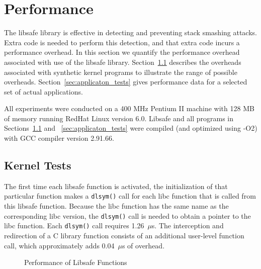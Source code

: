 \documentclass[]{article}
\begin{document}
\section{Performance}
\label{sec:performance}

The libsafe library is effective in detecting and preventing stack smashing
attacks.  Extra code is needed to perform this detection, and that extra code
incurs a performance overhead.  In this section we quantify the performance
overhead associated with use of the libsafe library.
Section~\ref{sec:kernel_tests} describes the overheads associated with
synthetic kernel programs to illustrate the range of possible overheads.
Section~\ref{sec:applicaton_tests} gives performance data for a selected set of
actual applications.

All experiments were conducted on a 400 MHz Pentium II machine with 128 MB of
memory running RedHat Linux version 6.0.  Libsafe and all programs in
Sections~\ref{sec:kernel_tests} and ~\ref{sec:applicaton_tests} were compiled
(and optimized using -O2) with GCC compiler version 2.91.66.


\subsection{Kernel Tests}
\label{sec:kernel_tests}

The first time each libsafe function is activated, the initialization of that
particular function makes a {\tt dlsym()} call for each libc function that is
called from this libsafe function.  Because the libc function has the same name
as the corresponding libc version, the {\tt dlsym()} call is needed to obtain a
pointer to the libc function.  Each {\tt dlsym()} call requires 1.26~$\mu$s.
The interception and redirection of a C library function consists of an
additional user-level function call, which approximately adds 0.04~$\mu$s of
overhead.

\begin{figure}[htbp]
\centerline{}
\caption{Performance of Libsafe Functions}
\label{fig:kernel_performance}
\end{figure}
\end{document}
